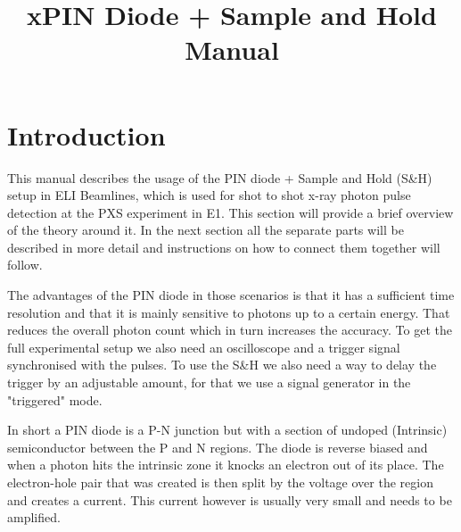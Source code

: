 \documentclass[a4paper, 10pt]{article}
\title{xPIN Diode + Sample and Hold Manual}
\begin{document}
\maketitle

\vspace*{15em}

\tableofcontents

\vspace{15em}

\section{Introduction}
This manual describes the usage of the PIN diode + Sample and Hold (S\&H) setup in ELI Beamlines, which is used for shot to shot x-ray photon pulse detection at the PXS experiment in E1.
This section will provide a brief overview of the theory around it.
In the next section all the separate parts will be described in more detail and instructions on how to connect them together will follow.

The advantages of the PIN diode in those scenarios is that it has a sufficient time resolution and that it is mainly sensitive to photons up to a certain energy.
That reduces the overall photon count which in turn increases the accuracy.
To get the full experimental setup we also need an oscilloscope and a trigger signal synchronised with the pulses.
To use the S\&H we also need a way to delay the trigger by an adjustable amount, for that we use a signal generator in the "triggered" mode.


In short a PIN diode is a P-N junction but with a section of undoped (Intrinsic) semiconductor between the P and N regions.
The diode is reverse biased and when a photon hits the intrinsic zone it knocks an electron out of its place.
The electron-hole pair that was created is then split by the voltage over the region and creates a current.
This current however is usually very small and needs to be amplified.
\end{document}
